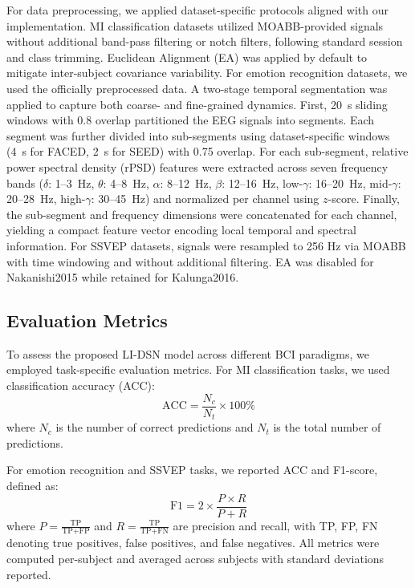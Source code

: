 \documentclass[journal]{IEEEtran}
\theoremstyle{plain}
\begin{document}
For data preprocessing, we applied dataset-specific protocols aligned with our implementation. MI classification datasets utilized MOABB-provided signals without additional band-pass filtering or notch filters, following standard session and class trimming. Euclidean Alignment (EA) was applied by default to mitigate inter-subject covariance variability. 
For emotion recognition datasets, we used the officially preprocessed data. A two-stage temporal segmentation was applied to capture both coarse- and fine-grained dynamics. First, 20~s sliding windows with 0.8 overlap partitioned the EEG signals into segments. Each segment was further divided into sub-segments using dataset-specific windows (4~s for FACED, 2~s for SEED) with 0.75 overlap. For each sub-segment, relative power spectral density (rPSD) features were extracted across seven frequency bands ($\delta$: 1–3~Hz, $\theta$: 4–8~Hz, $\alpha$: 8–12~Hz, $\beta$: 12–16~Hz, low-$\gamma$: 16–20~Hz, mid-$\gamma$: 20–28~Hz, high-$\gamma$: 30–45~Hz) and normalized per channel using $z$-score. Finally, the sub-segment and frequency dimensions were concatenated for each channel, yielding a compact feature vector encoding local temporal and spectral information.
For SSVEP datasets, signals were resampled to 256 Hz via MOABB with time windowing and without additional filtering. EA was disabled for Nakanishi2015 while retained for Kalunga2016.

\subsection{Evaluation Metrics}

To assess the proposed LI-DSN model across different BCI paradigms, we employed task-specific evaluation metrics. For MI classification tasks, we used classification accuracy (ACC):
\begin{equation}
\text{ACC} = \frac{N_c}{N_t} \times 100\%
\end{equation}
where $N_c$ is the number of correct predictions and $N_t$ is the total number of predictions.

For emotion recognition and SSVEP tasks, we reported ACC and F1-score, defined as:
\begin{equation}
\text{F1} = 2 \times \frac{P \times R}{P + R}
\end{equation}
where $P = \frac{\text{TP}}{\text{TP} + \text{FP}}$ and $R = \frac{\text{TP}}{\text{TP} + \text{FN}}$ are precision and recall, with TP, FP, FN denoting true positives, false positives, and false negatives. All metrics were computed per-subject and averaged across subjects with standard deviations reported.
\end{document}

